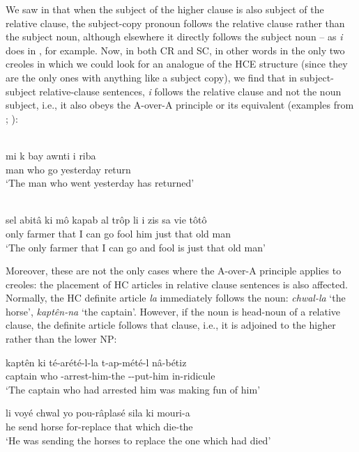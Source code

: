 We saw in  that when the subject of the higher clause is also subject of the relative clause, the subject-copy pronoun follows the relative clause rather than the subject noun, although elsewhere it directly follows the subject noun -- as \textit{i} does in , for example. Now, in both CR and SC, in other words in the only two creoles in which we could look for an analogue of the HCE structure (since they are the only ones with anything like a subject copy), we find that in subject-subject relative-clause sentences, \textit{i} follows the relative clause and not the noun subject, i.e., it also obeys the A-over-A principle or its equivalent (examples from \citealt[30]{Wilson1962}; \citealt[53]{Corne1977}):

\ea\label{ex:2:48}
\\
 \gll mi k bay awnti i riba\\
man who go yesterday {\PM} return\\
\glt `The man who went yesterday has returned'
\z
{}

\ea\label{ex:2:49}
\\
 \gll sel abit{\^a} ki m{\^o} kapab al tr{\^o}p li i zis sa vie t{\^o}t{\^o}\\
 only farmer that I can go fool him {\PM} just that old man  \\
\glt `The only farmer that I can go and fool is just that old man'
\z

Moreover, these are not the only cases where the A-over-A principle applies to creoles: the placement of HC articles in relative\-
clause sentences is also affected. Normally, the HC definite article \textit{la} immediately follows the noun: \textit{chwal-la} `the horse', \textit{kapt{\^e}n-na} `the captain'. However, if the noun is head-noun of a relative clause, the definite article follows that clause, i.e., it is adjoined to the higher rather than the lower NP:

\ea\label{ex:2:50}
\gll kapt{\^e}n ki té-arété-l-la t-ap-mété-l n{\^a}-bétiz\\
captain who \TNS-arrest-him-the \TNS-\ASP-put-him in-ridicule\\
\glt  `The captain who had arrested him was making fun of him'
\z

\ea\label{ex:2:51}
 \gll li voyé chwal yo pou-r{\^a}plasé sila ki mouri-a\\
he send horse {\PL} for-replace that which die-the\\
\glt `He was sending the horses to replace the one which had died'
\z

